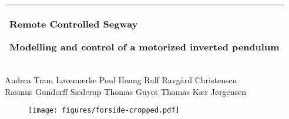 %
\begin{titlepage}
  \addtolength{\hoffset}{0.5\evensidemargin-0.5\oddsidemargin} %
  \noindent%
  \centering
  \begin{tabular}{@{}p{}@{}}
    \toprule[2pt]
    \midrule
    \vspace{0.2cm}
    \begin{center}
    \Huge{\textbf{
      Remote Controlled Segway %
    }}
    \end{center}
    \begin{center}
      \Large{
      Modelling and control of a motorized inverted pendulum
      }
    \end{center}
    \vspace{0.2cm}\\
    \midrule
    \toprule[2pt]
  \end{tabular}  
  
  \centering
  \vspace{0.7 cm}
  {
  Andrea Tram Løvemærke \hspace{0.5 cm} Poul Hoang \hspace{0.5 cm} Ralf Ravgård Christensen\\
  }
  \vspace{0.1 cm}
  { 
  Rasmus Gundorff Sæderup \hspace{0.5 cm} Thomas Guyot \hspace{0.5 cm} Thomas Kær Jørgensen
  }
  \vspace{0.4 cm}
\begin{figure}[H]
\centering
\texttt{[image: figures/forside-cropped.pdf]}
\end{figure}
\end{titlepage}

\clearpage